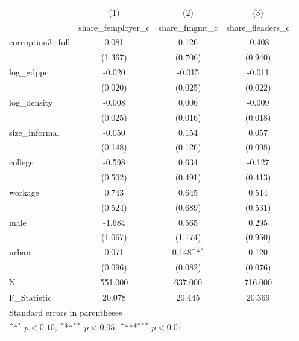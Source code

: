 {
\def\sym#1{\ifmmode^{#1}\else\(^{#1}\)\fi}
\begin{tabular}{l*{3}{c}}
\hline\hline
            &\multicolumn{1}{c}{(1)}&\multicolumn{1}{c}{(2)}&\multicolumn{1}{c}{(3)}\\
            &\multicolumn{1}{c}{share\_femployer\_c}&\multicolumn{1}{c}{share\_fmgmt\_c}&\multicolumn{1}{c}{share\_fleaders\_c}\\
\hline
corruption3\_full&       0.081         &       0.126         &      -0.408         \\
            &     (1.367)         &     (0.706)         &     (0.940)         \\
[1em]
log\_gdppc   &      -0.020         &      -0.015         &      -0.011         \\
            &     (0.020)         &     (0.025)         &     (0.022)         \\
[1em]
log\_density &      -0.008         &       0.006         &      -0.009         \\
            &     (0.025)         &     (0.016)         &     (0.018)         \\
[1em]
size\_informal&      -0.050         &       0.154         &       0.057         \\
            &     (0.148)         &     (0.126)         &     (0.098)         \\
[1em]
college     &      -0.598         &       0.634         &      -0.127         \\
            &     (0.502)         &     (0.491)         &     (0.413)         \\
[1em]
workage     &       0.743         &       0.645         &       0.514         \\
            &     (0.524)         &     (0.689)         &     (0.531)         \\
[1em]
male        &      -1.684         &       0.565         &       0.295         \\
            &     (1.067)         &     (1.174)         &     (0.950)         \\
[1em]
urban       &       0.071         &       0.148\sym{*}  &       0.120         \\
            &     (0.096)         &     (0.082)         &     (0.076)         \\
\hline
N           &     551.000         &     637.000         &     716.000         \\
F\_Statistic &      20.078         &      20.445         &      20.369         \\
\hline\hline
\multicolumn{4}{l}{\footnotesize Standard errors in parentheses}\\
\multicolumn{4}{l}{\footnotesize \sym{*} \(p<0.10\), \sym{**} \(p<0.05\), \sym{***} \(p<0.01\)}\\
\end{tabular}
}
